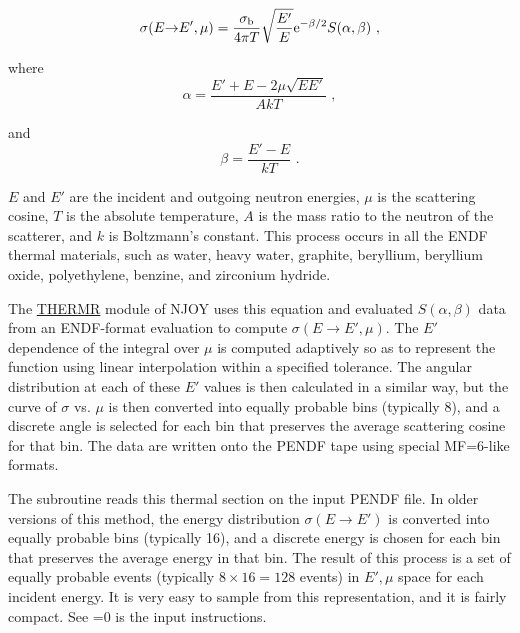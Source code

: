 \begin{equation}
  \sigma(E{\rightarrow}E',\mu)=\frac{\sigma_{\rm b}}
   {4\pi T}\sqrt{\frac{E'}{E}}{\rm e}^{-\beta/2}S(\alpha,\beta)\,\,,
\end{equation}
\vspace{0.5 pt}

\noindent
where
\begin{equation}
  \alpha=\frac{E'+E-2\mu\sqrt{EE'}}{AkT}\,\,,
\end{equation}
\vspace{0.5 pt}

\noindent and
\begin{equation}
  \beta=\frac{E'-E}{kT}\,\,.
\end{equation}
\vspace{0.5 pt}

\noindent
$E$ and $E'$ are the incident and outgoing neutron
energies, $\mu$ is the scattering cosine, $T$ is the absolute
temperature, $A$ is the mass ratio to the neutron of the
scatterer, and $k$ is Boltzmann's constant.  This process
occurs in all the ENDF thermal materials, such as water,
heavy water, graphite, beryllium, beryllium oxide, polyethylene,
benzine, and zirconium hydride.

The \hyperlink{sTHERMRhy}{THERMR}
module of NJOY uses this equation and evaluated
$S(\alpha,\beta)$ data from an ENDF-format
evaluation to compute $\sigma(E{\rightarrow}E',\mu)$.  The $E'$ dependence
of the integral over $\mu$ is computed adaptively so as to
represent the function using linear interpolation within a
specified tolerance.  The angular distribution at each of
these $E'$ values is then calculated in a similar way, but
the curve of $\sigma$ vs. $\mu$ is then converted into
equally probable bins (typically 8), and a discrete angle is
selected for each bin that preserves the average scattering
cosine for that bin.  The data are written onto the PENDF
tape using special MF=6-like formats.

The  subroutine reads this
thermal section on the input PENDF file.  In older
versions of this method, the energy distribution
$\sigma(E\rightarrow E')$ is converted into equally probable bins
(typically 16), and a discrete energy is chosen for each bin that
preserves the average energy in that bin.  The result of this process
is a set of equally probable events
(typically $8\times 16=128$ events) in $E',\mu$ space for each
incident energy.  It is very easy to sample from this representation,
and it is fairly compact.  See =0 is the input
instructions.

